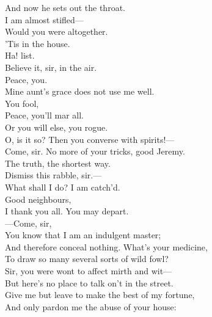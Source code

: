 \documentclass[a4paper,oneside]{memoir}
\begin{document}
\begin{drama*}
And now he sets out the throat.\\
\dapperspeaks {}  I am almost stifled---\\
\facespeaks {} Would you were altogether.\\
\lovewitspeaks {} 'Tis in the house.\\
Ha! list.\\
\facespeaks {} Believe it, sir, in the air.\\
\lovewitspeaks {} Peace, you.\\
\dapperspeaks {} Mine aunt's grace does not use me well.\\
\subtlespeaks {}  You fool,\\
Peace, you'll mar all.\\
\facespeaks {}
 Or you will else, you rogue.\\
\lovewitspeaks O, is it so? Then you converse with spirits!---\\
Come, sir. No more of your tricks, good Jeremy.\\
The truth, the shortest way.\\
\facespeaks {} Dismiss this rabble, sir.---\\
What shall I do? I am catch'd.\\
\lovewitspeaks {} Good neighbours,\\
I thank you all. You may depart.\\
 ---Come, sir,\\
You know that I am an indulgent master;\\
And therefore conceal nothing. What's your medicine,\\
To draw so many several sorts of wild fowl?\\
\facespeaks Sir, you were wont to affect mirth and wit---\\
But here's no place to talk on't in the street.\\
Give me but leave to make the best of my fortune,\\
And only pardon me the abuse of your house:\\

\end{drama*}
\end{document}
